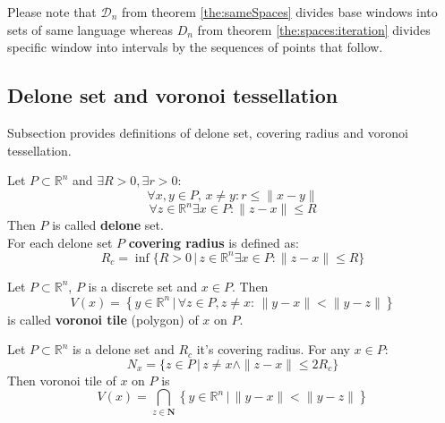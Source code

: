 \documentclass[text.tex]{subfiles}
\begin{document}
\begin{remark}
Please note that $\mathcal{D}_n$ from theorem \ref{the:sameSpaces} divides base windows into sets of same language whereas $D_n$ from theorem \ref{the:spaces:iteration} divides specific window into intervals by the sequences of points that follow.
\end{remark}


\subsection*{Delone set and voronoi tessellation}

Subsection provides definitions of delone set, covering radius and voronoi tessellation.

\begin{definition}
Let $P\subset \mathbb{R}^n$ and $\exists R>0, \exists r>0$:
$$\forall x,y\in P,\, x\neq y: r\leq \|x-y\|$$
$$\forall z\in\mathbb{R}^n \exists x\in P: \|z-x\|\leq R$$
Then $P$ is called \textbf{delone} set.\\
For each delone set $P$ \textbf{covering radius} is defined as:
$$R_c = \inf\{R>0\,|\, z\in\mathbb{R}^n \exists x\in P: \|z-x\|\leq R\}$$
\end{definition}

\begin{definition}

Let $P\subset \mathbb{R}^n$, $P$ is a discrete set and $x\in P$. Then
$$V(x) = \left\{ y \in \mathbb{R}^n \,|\, \forall z \in P, z\neq x:\, \|y-x\|<\|y-z\| \right\}$$
is called \textbf{voronoi tile} (polygon) of $x$ on $P$.
\end{definition}

\begin{theorem}
\label{the:radiusLimit}
Let $P\subset \mathbb{R}^n$ is a delone set and $R_c$ it's covering radius. For any $x\in P$:
$$N_x = \{z\in P\,|\, z\neq x \wedge \|z-x\|\leq 2R_c\}$$
Then voronoi tile of $x$ on $P$ is
$$V(x) = \bigcap_{z\in \boldsymbol{N}} \left\{ y \in \mathbb{R}^n \,|\, \|y-x\|<\|y-z\| \right\}$$
\end{theorem}
\end{document}
